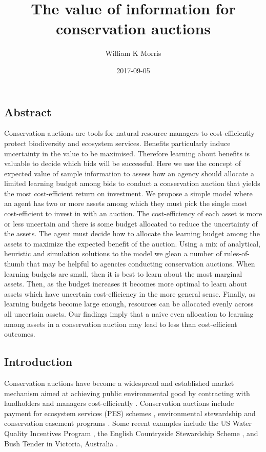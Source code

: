 \documentclass[]{article}
\title{The value of information for conservation auctions}
\author{William K Morris}
\date{2017-09-05}
\theoremstyle{definition}
\theoremstyle{definition}
\theoremstyle{remark}
\begin{document}
\maketitle


\subsection*{Abstract}\label{abstract}

Conservation auctions are tools for natural resource managers to cost-efficiently protect biodiversity and ecosystem services. Benefits particularly induce uncertainty in the value to be maximised. Therefore learning about benefits is valuable to decide which bids will be successful. Here we use the concept of expected value of sample information to assess how an agency should allocate a limited learning budget among bids to conduct a conservation auction that yields the most cost-efficient return on investment. We propose a simple model where an agent has two or more assets among which they must pick the single most cost-efficient to invest in with an auction. The cost-efficiency of each asset is more or less uncertain and there is some budget allocated to reduce the uncertainty of the assets. The agent must decide how to allocate the learning budget among the assets to maximize the expected benefit of the auction. Using a mix of analytical, heuristic and simulation solutions to the model we glean a number of rules-of-thumb that may be helpful to agencies conducting conservation auctions. When learning budgets are small, then it is best to learn about the most marginal assets. Then, as the budget increases it becomes more optimal to learn about assets which have uncertain cost-efficiency in the more general sense. Finally, as learning budgets become large enough, resources can be allocated evenly across all uncertain assets. Our findings imply that a naive even allocation to learning among assets in a conservation auction may lead to less than cost-efficient outcomes.

\subsection*{Introduction}\label{introduction}

Conservation auctions have become a widespread and established market
mechanism aimed at achieving public environmental good by contracting
with landholders and managers cost-efficiently \citep{Schomers2013}.
Conservation auctions include payment for ecosystem services (PES)
schemes \citep{Engel2008}, environmental stewardship \citep{Ribaudo2008}
and conservation easement programs \citep{Brown2011}. Some recent
examples include the US Water Quality Incentives Program
\citep{Kraft1996}, the English Countryside Stewardship Scheme
\citep{Lobley1998}, and Bush Tender in Victoria, Australia
\citep{Stoneham2003}.
\end{document}

